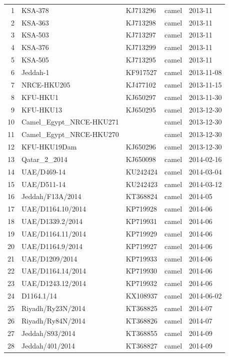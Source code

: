 \documentclass[11pt,oneside,letterpaper]{article}
\begin{document}
\begin{longtable}{ | r | l | p{2cm} | l | l | }
  1 & KSA-378 & KJ713296 & camel & 2013-11 \\
  2 & KSA-363 & KJ713298 & camel & 2013-11 \\
  3 & KSA-503 & KJ713297 & camel & 2013-11 \\
  4 & KSA-376 & KJ713299 & camel & 2013-11 \\
  5 & KSA-505 & KJ713295 & camel & 2013-11 \\
  6 & Jeddah-1 & KF917527 & camel & 2013-11-08 \\
  7 & NRCE-HKU205 & KJ477102 & camel & 2013-11-15 \\
  8 & KFU-HKU1 & KJ650297 & camel & 2013-11-30 \\
  9 & KFU-HKU13 & KJ650295 & camel & 2013-12-30 \\
  10 & Camel\_Egypt\_NRCE-HKU271 &  & camel & 2013-12-30 \\
  11 & Camel\_Egypt\_NRCE-HKU270 &  & camel & 2013-12-30 \\
  12 & KFU-HKU19Dam & KJ650296 & camel & 2013-12-30 \\
  13 & Qatar\_2\_2014 & KJ650098 & camel & 2014-02-16 \\
  14 & UAE/D469-14 & KU242424 & camel & 2014-03-04 \\
  15 & UAE/D511-14 & KU242423 & camel & 2014-03-12 \\
  16 & Jeddah/F13A/2014 & KT368824 & camel & 2014-05 \\
  17 & UAE/D1164.10/2014 & KP719928 & camel & 2014-06 \\
  18 & UAE/D1339.2/2014 & KP719931 & camel & 2014-06 \\
  19 & UAE/D1164.11/2014 & KP719929 & camel & 2014-06 \\
  20 & UAE/D1164.9/2014 & KP719927 & camel & 2014-06 \\
  21 & UAE/D1209/2014 & KP719933 & camel & 2014-06 \\
  22 & UAE/D1164.14/2014 & KP719930 & camel & 2014-06 \\
  23 & UAE/D1243.12/2014 & KP719932 & camel & 2014-06 \\
  24 & D1164.1/14 & KX108937 & camel & 2014-06-02 \\
  25 & Riyadh/Ry23N/2014 & KT368825 & camel & 2014-07 \\
  26 & Riyadh/Ry84N/2014 & KT368826 & camel & 2014-07 \\
  27 & Jeddah/S93/2014 & KT368855 & camel & 2014-09 \\
  28 & Jeddah/401/2014 & KT368827 & camel & 2014-09 \\

\end{longtable}
\end{document}
